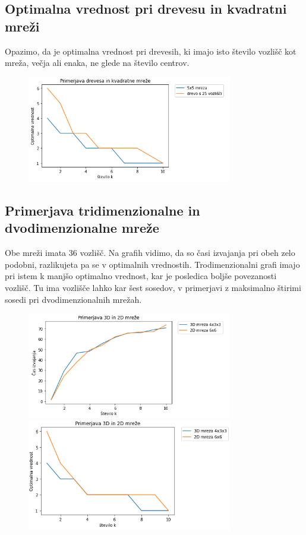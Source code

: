 \documentclass[a4paper]{article}
\begin{document}
\subsection{Optimalna vrednost pri drevesu in kvadratni mreži}
Opazimo, da je optimalna vrednost pri drevesih, ki imajo isto število vozlišč kot mreža, večja ali enaka, ne glede na število centrov.
\begin{figure}[h!]
  \centering
  \includegraphics[width= 0.8\textwidth]{drevo_vs_kvadratna}
\end{figure}

\newpage

\subsection{Primerjava tridimenzionalne in dvodimenzionalne mreže}
Obe mreži imata 36 vozlišč. Na grafih vidimo, da so časi izvajanja pri obeh zelo podobni, razlikujeta pa se v optimalnih vrednostih. Trodimenzionalni grafi imajo pri istem k manjšo optimalno vrednost, kar je posledica boljše povezanosti vozlišč. Tu ima vozlišče lahko kar šest sosedov, v primerjavi z maksimalno štirimi sosedi pri dvodimenzionalnih mrežah.
\begin{figure}[h!]
  \centering
  \includegraphics[width= 0.8\textwidth]{cas_3D_vs_2D}
  \includegraphics[width= 0.8\textwidth]{R_3D_vs_2D}
\end{figure}
\end{document}
